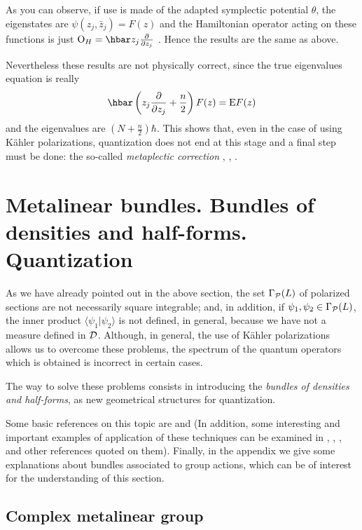 \documentclass[12pt]{article}
\theoremstyle{plain}
\def\dst{\(}
\def\derpar#1#2{\frac{\partial{#1}}{\partial{#2}}}
\def\P{{\cal P}}
\def\D{{\cal D}}
\def\Op{{\rm O}}
\begin{document}
As you can observe, if use is made of the adapted symplectic potential
$\theta$, the eigenstates are
$\psi (z_j,\bar z_j) = F(z)$
and the Hamiltonian operator acting on these functions is just
\dst\Op_H = \hbar z_j \derpar{}{z_j}\) .
Hence the results are the same as above.

Nevertheless these results are not physically correct,
since the true eigenvalues equation is really
$$
\hbar\left(z_j \derpar{}{z_j} +\frac{n}{2}\right)F(z) = {\rm E} F(z)
$$
and the eigenvalues are $(N+\frac{n}{2})\hbar$.
This shows that, even in the case of using
K\"ahler polarizations, quantization does not end
at this stage and a final step must be done:
the so-called {\it metaplectic correction}
\cite{Sn-80}, \cite{Tu-85}, \cite{Wo-80}.



\section{Metalinear bundles. Bundles of densities and half-forms.
\\ Quantization}


As we have already pointed out in the above section,
the set $\Gamma_\P (L)$ of polarized sections are not necessarily square
integrable;
and, in addition, if $\psi_1,\psi_2 \in \Gamma_\P (L)$,
the inner product $\langle \psi_1 | \psi_2 \rangle$
is not defined, in general, because we have not
a measure defined in $\D$.
Although, in general, the use of K\"ahler polarizations
allows us to overcome these problems, the spectrum of the quantum
operators
which is obtained is incorrect in certain cases.

The way to solve these problems consists in introducing
the {\it bundles of densities and half-forms}, as new geometrical
structures
for quantization.

Some basic references on this topic are \cite{Ga-83} and \cite{Wo-80}
(In addition, some interesting and important examples of application of
these techniques
can be examined in \cite{Sn-80}, \cite{Tu-85}, \cite{Wo-80},
and other references quoted on them).
Finally, in the appendix we give some explanations about bundles
associated to
group actions, which can be of interest for the understanding of this
section.



\subsection{Complex metalinear group}
\end{document}
